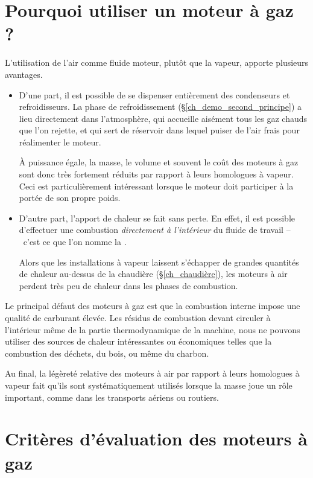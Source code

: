 \section{Pourquoi utiliser un moteur à gaz ?}

	L’utilisation de l’air comme fluide moteur, plutôt que la vapeur, apporte plusieurs avantages.

	\begin{itemize}
		\item D’une part, il est possible de se dispenser entièrement des condenseurs et refroidisseurs. La phase de refroidissement (\S\ref{ch_demo_second_principe}) a lieu directement dans l’atmosphère, qui accueille aisément tous les gaz chauds que l’on rejette, et qui sert de réservoir dans lequel puiser de l’air frais pour réalimenter le moteur.

		À puissance égale, la masse, le volume et souvent le coût des moteurs à gaz sont donc très fortement réduits par rapport à leurs homologues à vapeur. Ceci est particulièrement intéressant lorsque le moteur doit participer à la portée de son propre poids.

		\item D’autre part, l’apport de chaleur se fait sans perte. En effet, il est possible d’effectuer une combustion \emph{directement à l’intérieur} du fluide de travail --\ c’est ce que l’on nomme la .

		Alors que les installations à vapeur laissent s’échapper de grandes quantités de chaleur au-dessus de la chaudière (\S\ref{ch_chaudière}), les moteurs à air perdent très peu de chaleur dans les phases de combustion.
	\end{itemize}

	Le principal défaut des moteurs à gaz est que la combustion interne impose une qualité de carburant élevée. Les résidus de combustion devant circuler à l’intérieur même de la partie thermodynamique de la machine, nous ne pouvons utiliser des sources de chaleur intéressantes ou économiques telles que la combustion des déchets, du bois, ou même du charbon.

	Au final, la légèreté relative des moteurs à air par rapport à leurs homologues à vapeur fait qu’ils sont systématiquement utilisés lorsque la masse joue un rôle important, comme dans les transports aériens ou routiers.



\section{Critères d’évaluation des moteurs à gaz}
\label{ch_criteres_evaluation_moteurs_gaz}

